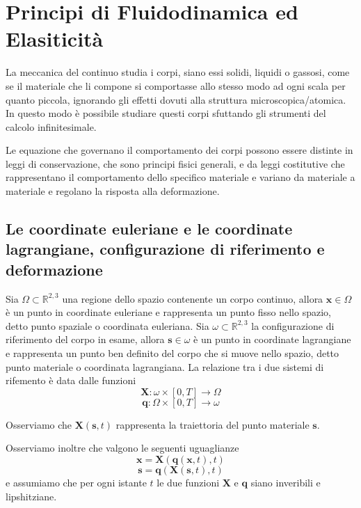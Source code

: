 
\chapter{Principi di Fluidodinamica ed Elasiticità}

La meccanica del continuo studia i corpi, siano essi solidi, liquidi o gassosi, come se il materiale che li compone si comportasse allo stesso modo ad ogni scala per quanto piccola, ignorando gli effetti dovuti alla struttura microscopica/atomica. In questo modo è possibile studiare questi corpi sfuttando gli strumenti del calcolo infinitesimale.

Le equazione che governano il comportamento dei corpi possono essere distinte in leggi di conservazione, che sono principi fisici generali, e da leggi costitutive che rappresentano il comportamento dello specifico materiale e variano da materiale a materiale e regolano la risposta alla deformazione.

\section{Le coordinate euleriane e le coordinate lagrangiane, configurazione di riferimento e deformazione}

Sia $\Omega \subset \mathbb{R}^{2,3}$ una regione dello spazio contenente un corpo continuo, allora $\mathbf{x} \in \Omega$ è un punto in coordinate euleriane e rappresenta un punto fisso nello spazio, detto punto spaziale o coordinata euleriana. 
Sia $\omega \subset \mathbb{R}^{2,3}$ la configurazione di riferimento del corpo in esame, allora $\mathbf{s} \in \omega$ è un punto in coordinate lagrangiane e rappresenta un punto ben definito del corpo che si muove nello spazio, detto punto materiale o coordinata lagrangiana.
La relazione tra i due sistemi di rifemento è data dalle funzioni
\begin{equation*}  
\mathbf{X}:\omega \times [0,T] \to \Omega
\end{equation*}
\begin{equation*}  
\mathbf{q}:\Omega \times [0,T] \to \omega
\end{equation*}

Osserviamo che $\mathbf{X}(\mathbf{s},t)$ rappresenta la traiettoria del punto materiale $\mathbf{s}$.

Osserviamo inoltre che valgono le seguenti uguaglianze
\begin{equation*}  
\mathbf{x} = \mathbf{X}(\mathbf{q}(\mathbf{x},t),t)
\end{equation*}
\begin{equation*}  
\mathbf{s} = \mathbf{q}(\mathbf{X}(\mathbf{s},t),t)
\end{equation*}
e assumiamo che per ogni istante $t$ le due funzioni $\mathbf{X}$ e $\mathbf{q}$ siano inveribili e lipshitziane.

